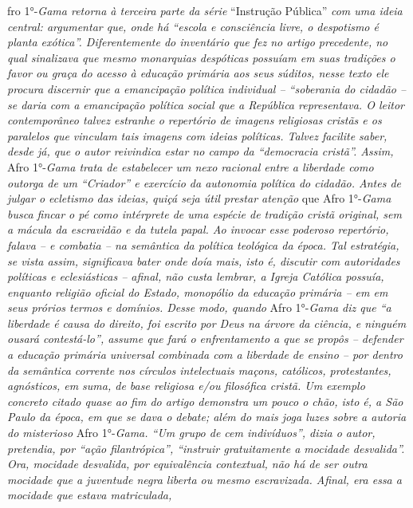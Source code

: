 \begin{didascalia}
fro 1°-\emph{Gama retorna à terceira parte da série} ``Instrução Pública''
\emph{com uma ideia central: argumentar que, onde há ``escola e
consciência livre, o despotismo é planta exótica''. Diferentemente do
inventário que fez no artigo precedente, no qual sinalizava que mesmo
monarquias despóticas possuíam em suas tradições o favor ou graça do
acesso à educação primária aos seus súditos, nesse texto ele procura
discernir que a emancipação política individual -- ``soberania do cidadão
-- se daria com a emancipação política social que a República
representava. O leitor contemporâneo talvez estranhe o repertório de
imagens religiosas cristãs e os paralelos que vinculam tais imagens com
ideias políticas. Talvez facilite saber, desde já, que o autor
reivindica estar no campo da ``democracia cristã''. Assim,} Afro
1°-\emph{Gama trata de estabelecer um nexo racional entre a liberdade
como outorga de um ``Criador'' e exercício da autonomia política do
cidadão. Antes de julgar o ecletismo das ideias, quiçá seja útil prestar
atenção} que Afro 1°-\emph{Gama busca fincar o pé como intérprete de uma
espécie de tradição cristã original, sem a mácula da escravidão e da
tutela papal. Ao invocar esse poderoso repertório, falava -- e combatia
-- na semântica da política teológica da época. Tal estratégia, se vista
assim, significava bater onde doía mais, isto é, discutir com
autoridades políticas e eclesiásticas -- afinal, não custa lembrar, a
Igreja Católica possuía, enquanto religião oficial do Estado, monopólio
da educação primária -- em em seus prórios termos e domínios. Desse
modo, quando} Afro 1°-\emph{Gama diz que ``a liberdade é causa do
direito, foi escrito por Deus na árvore da ciência, e ninguém ousará
contestá-lo'', assume que fará o enfrentamento a que se propôs --
defender a educação primária universal combinada com a liberdade de
ensino -- por dentro da semântica corrente nos círculos intelectuais
maçons, católicos, protestantes, agnósticos, em suma, de base religiosa
e/ou filosófica cristã. Um exemplo concreto citado quase ao fim do
artigo demonstra um pouco o chão, isto é, a São Paulo da época, em que
se dava o debate; além do mais joga luzes sobre a autoria do misterioso}
Afro 1°-\emph{Gama. ``Um grupo de cem indivíduos'', dizia o autor,
pretendia, por ``ação filantrópica'', ``instruir gratuitamente a mocidade
desvalida''. Ora, mocidade desvalida, por equivalência contextual, não há
de ser outra mocidade que a juventude negra liberta ou mesmo
escravizada. Afinal, era essa a mocidade que estava matriculada,
}
\end{didascalia}
